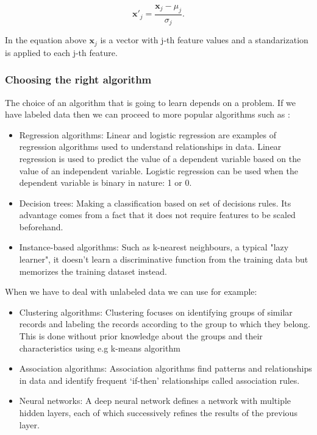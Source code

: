 \documentclass[a4paper,oneside,openright,11pt]{book}
\begin{document}

\begin{equation}
    \textbf{x}'_{j} = \frac{\textbf{x}_{j} - \mu_{j}}{\sigma_{j}}.
\end{equation}

In the equation above $\textbf{x}_j$ is a vector with j-th feature values and a standarization is applied to each j-th feature.

\subsubsection{Choosing the right algorithm}

The choice of an algorithm that is going to learn depends on a problem. If we have labeled data then we can proceed to more popular algorithms such as \cite{raschka}:

\begin{itemize}
    \item Regression algorithms: Linear and logistic regression are examples of regression algorithms used to understand relationships in data. Linear regression is used to predict the value of a dependent variable based on the value of an independent variable. Logistic regression can be used when the dependent variable is binary in nature: 1 or 0.
    \item Decision trees: Making a classification based on set of decisions rules. Its advantage comes from a fact that it does not require features to be scaled beforehand.
    \item Instance-based algorithms: Such as k-nearest neighbours, a typical "lazy learner", it doesn't learn a discriminative function from the training data but memorizes the training dataset instead.
\end{itemize}

When we have to deal with unlabeled data we can use for example:

\begin{itemize}
    \item Clustering algorithms: Clustering focuses on identifying groups of similar records and labeling the records according to the group to which they belong. This is done without prior knowledge about the groups and their characteristics using e.g k-means algorithm
    \item Association algorithms: Association algorithms find patterns and relationships in data and identify frequent ‘if-then’ relationships called association rules.
    \item Neural networks: A deep neural network defines a network with multiple hidden layers, each of which successively refines the results of the previous layer. 
\end{itemize}
\end{document}
